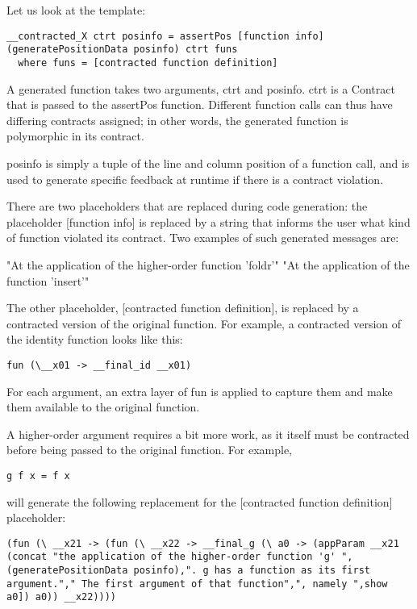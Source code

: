 \documentclass[10pt]{report}
\begin{document}
Let us look at the template:

\begin{lstlisting}
__contracted_X ctrt posinfo = assertPos [function info] (generatePositionData posinfo) ctrt funs
  where funs = [contracted function definition]
\end{lstlisting}

A generated function takes two arguments, ctrt and posinfo.
ctrt is a Contract that is passed to the assertPos function. 
Different function calls can thus have differing contracts assigned;
in other words, the generated function is polymorphic in its contract.

posinfo is simply a tuple of the line and column position of a function call, and is used to generate specific feedback at runtime if there is a contract violation.

There are two placeholders that are replaced during code generation:
the placeholder [function info] is replaced by a string that informs the user what kind of function violated its contract.
Two examples of such generated messages are:

"At the application of the higher-order function 'foldr'"
"At the application of the function 'insert'"

The other placeholder, [contracted function definition], is replaced by a contracted version of the original function.
For example, a contracted version of the identity function looks like this:

\begin{lstlisting}
fun (\__x01 -> __final_id __x01)
\end{lstlisting}

For each argument, an extra layer of fun is applied to capture them and make them available to the original function.

A higher-order argument requires a bit more work, as it itself must be contracted before being passed to the original function.
For example,

\begin{lstlisting}
g f x = f x
\end{lstlisting}

will generate the following replacement for the [contracted function definition] placeholder:

\begin{lstlisting}
(fun (\ __x21 -> (fun (\ __x22 -> __final_g (\ a0 -> (appParam __x21 (concat "the application of the higher-order function 'g' ",(generatePositionData posinfo),". g has a function as its first argument."," The first argument of that function",", namely ",show a0]) a0)) __x22))))
\end{lstlisting}
\end{document}
